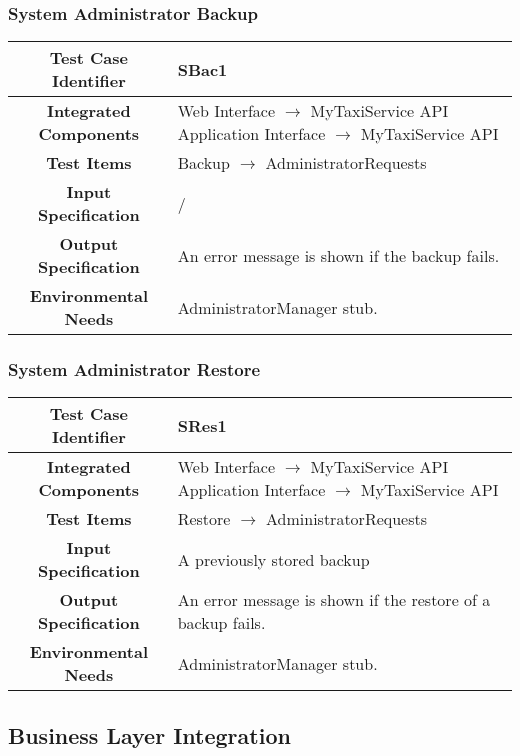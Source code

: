 \documentclass[11pt, a4paper,titlepage]{article}
\begin{document}
	\subsubsection{System Administrator Backup}
	\begin{tabularx}{\textwidth}{| c|X|}
		\hline \textbf{Test Case Identifier} & \label{SBac1}SBac1 \\
		\hline \textbf{Integrated Components} & Web Interface $\rightarrow $ MyTaxiService API \newline 
		Application Interface $\rightarrow $ MyTaxiService API \\
		\hline \textbf{Test Items} & Backup $\rightarrow $ AdministratorRequests \\
		\hline \textbf{Input Specification} & / \\
		\hline \textbf{Output Specification} & An error message is shown if the backup fails. \\
		\hline \textbf{Environmental Needs} & AdministratorManager stub. \\
		\hline
	\end{tabularx}
	\newline
	\newline
	\subsubsection{System Administrator Restore}
	\begin{tabularx}{\textwidth}{| c|X|}
		\hline \textbf{Test Case Identifier} & \label{SRes1}SRes1 \\
		\hline \textbf{Integrated Components} & Web Interface $\rightarrow $ MyTaxiService API \newline 
		Application Interface $\rightarrow $ MyTaxiService API \\
		\hline \textbf{Test Items} & Restore $\rightarrow $ AdministratorRequests \\
		\hline \textbf{Input Specification} & A previously stored backup \\
		\hline \textbf{Output Specification} & An error message is shown if the restore of a backup fails. \\
		\hline \textbf{Environmental Needs} & AdministratorManager stub. \\
		\hline
	\end{tabularx}
	\newpage
	\subsection{Business Layer Integration}
\end{document}

